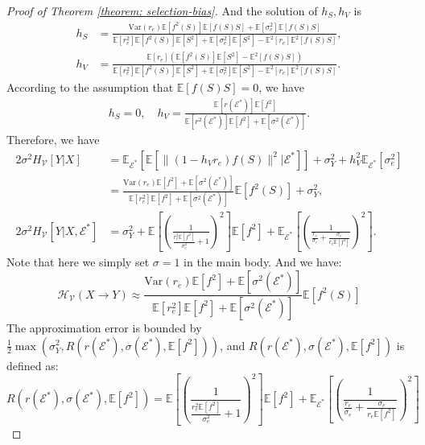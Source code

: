\begin{proof}[Proof of Theorem \ref{theorem: selection-bias}]
	And the solution of $h_S,h_V$ is
	\begin{align}
		h_S &= \frac{\text{Var}(r_e)\mathbb{E}[f^2(S)]\mathbb{E}[f(S)S]+\mathbb{E}[\sigma_e^2]\mathbb{E}[f(S)S]}{\mathbb{E}[r_e^2]\mathbb{E}[f^2(S)]\mathbb{E}[S^2] + \mathbb{E}[\sigma_e^2]\mathbb{E}[S^2] - \mathbb{E}^2[r_e]\mathbb{E}^2[f(S)S]},\\
		h_V &= \frac{\mathbb{E}[r_e](\mathbb{E}[f^2(S)]\mathbb{E}[S^2]-\mathbb{E}^2[f(S)S])}{\mathbb{E}[r_e^2]\mathbb{E}[f^2(S)]\mathbb{E}[S^2] + \mathbb{E}[\sigma_e^2]\mathbb{E}[S^2] - \mathbb{E}^2[r_e]\mathbb{E}^2[f(S)S]}.
	\end{align}
	According to the assumption that $\mathbb{E}[f(S)S]=0$, we have
	\begin{align}
		h_S = 0,\quad
		h_V = \frac{\mathbb{E}[r(\mathcal E^*)]\mathbb{E}[f^2]}{\mathbb{E}[r^2(\mathcal E^*)]\mathbb{E}[f^2]+\mathbb{E}[\sigma^2(\mathcal E^*)]}.
	\end{align}
	Therefore, we have
	\begin{align}
		2\sigma^2 H_{\mathcal{V}}[Y|X] &= \mathbb{E}_{\mathcal{E}^*}[\mathbb{E}[\|(1-h_Vr_e)f(S)\|^2|\mathcal{E}^*]] + \sigma_Y^2+h_V^2\mathbb{E}_{\mathcal{E}^*}[\sigma_e^2]\\
		&= \frac{\text{Var}(r_e)\mathbb{E}[f^2]+\mathbb{E}[\sigma^2(\mathcal E^*)]}{\mathbb{E}[r_e^2]\mathbb{E}[f^2]+\mathbb{E}[\sigma^2(\mathcal E^*)]}\mathbb{E}[f^2(S)]+ \sigma_Y^2,\\
		2\sigma^2 H_{\mathcal{V}}[Y|X,\mathcal{E}^*] &= \sigma_Y^2+ \mathbb{E}[(\frac{1}{\frac{r_e^2\mathbb{E}[f^2]}{\sigma_e^2}+1})^2]\mathbb{E}[f^2]+ \mathbb{E}_{\mathcal{E}^*}[(\frac{1}{\frac{r_e}{\sigma_e}+\frac{\sigma_e}{r_e\mathbb{E}[f^2]}})^2].
	\end{align}
	Note that here we simply set $\sigma=1$ in the main body.
    And we have:
    \begin{equation}
        \mathcal{H}_{\mathcal V}(X\rightarrow Y)\approx \frac{\text{Var}(r_e)\mathbb{E}[f^2]+\mathbb{E}[\sigma^2(\mathcal E^*)]}{\mathbb{E}[r_e^2]\mathbb{E}[f^2]+\mathbb{E}[\sigma^2(\mathcal E^*)]}\mathbb{E}[f^2(S)]
    \end{equation}
    The approximation error is bounded by $\frac{1}{2}\max(\sigma_Y^2, R(r(\mathcal E^*), \sigma(\mathcal E^*), \mathbb{E}[f^2]))$, and $R(r(\mathcal E^*), \sigma(\mathcal E^*), \mathbb{E}[f^2])$ is defined as:
    \begin{equation}
        R(r(\mathcal E^*), \sigma(\mathcal E^*), \mathbb{E}[f^2]) = \mathbb{E}[(\frac{1}{\frac{r_e^2\mathbb{E}[f^2]}{\sigma_e^2}+1})^2]\mathbb{E}[f^2]+ \mathbb{E}_{\mathcal{E}^*}[(\frac{1}{\frac{r_e}{\sigma_e}+\frac{\sigma_e}{r_e\mathbb{E}[f^2]}})^2]
    \end{equation}
\end{proof}

